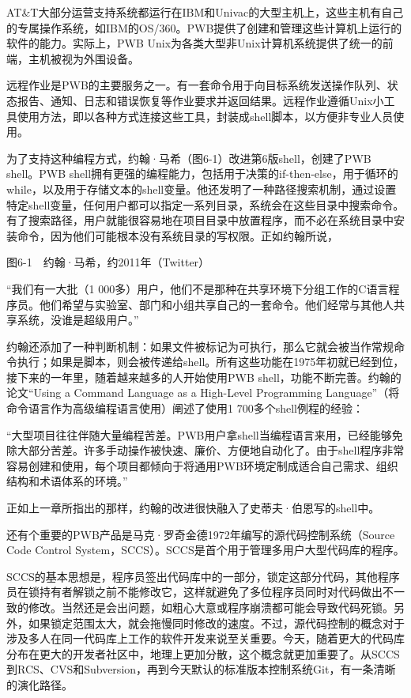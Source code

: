 \documentclass[a4paper,12pt,UTF8,twoside]{ctexbook}
\begin{document}
{{AT\&T大部分运营支持系统都运行在IBM和Univac的大型主机上，这些主机有自己的专属操作系统，如IBM的OS/360。PWB提供了创建和管理这些计算机上运行的软件的能力。实际上，PWB Unix为各类大型非Unix计算机系统提供了统一的前端，主机被视为外围设备。

远程作业是PWB的主要服务之一。有一套命令用于向目标系统发送操作队列、状态报告、通知、日志和错误恢复等作业要求并返回结果。远程作业遵循Unix小工具使用方法，即以各种方式连接这些工具，封装成shell脚本，以方便非专业人员使用。

为了支持这种编程方式，约翰·马希（图6-1）改进第6版shell，创建了PWB shell。PWB shell拥有更强的编程能力，包括用于决策的if-then-else，用于循环的while，以及用于存储文本的shell变量。他还发明了一种路径搜索机制，通过设置特定shell变量，任何用户都可以指定一系列目录，系统会在这些目录中搜索命令。有了搜索路径，用户就能很容易地在项目目录中放置程序，而不必在系统目录中安装命令，因为他们可能根本没有系统目录的写权限。正如约翰所说，



图6-1　约翰·马希，约2011年（Twitter）

“我们有一大批（1 000多）用户，他们不是那种在共享环境下分组工作的C语言程序员。他们希望与实验室、部门和小组共享自己的一套命令。他们经常与其他人共享系统，没谁是超级用户。”



约翰还添加了一种判断机制：如果文件被标记为可执行，那么它就会被当作常规命令执行；如果是脚本，则会被传递给shell。所有这些功能在1975年初就已经到位，接下来的一年里，随着越来越多的人开始使用PWB shell，功能不断完善。约翰的论文“Using a Command Language as a High-Level Programming Language”（将命令语言作为高级编程语言使用）阐述了使用1 700多个shell例程的经验：

“大型项目往往伴随大量编程苦差。PWB用户拿shell当编程语言来用，已经能够免除大部分苦差。许多手动操作被快速、廉价、方便地自动化了。由于shell程序非常容易创建和使用，每个项目都倾向于将通用PWB环境定制成适合自己需求、组织结构和术语体系的环境。”



正如上一章所指出的那样，约翰的改进很快融入了史蒂夫·伯恩写的shell中。

还有个重要的PWB产品是马克·罗奇金德1972年编写的源代码控制系统（Source Code Control System，SCCS）。SCCS是首个用于管理多用户大型代码库的程序。

SCCS的基本思想是，程序员签出代码库中的一部分，锁定这部分代码，其他程序员在锁持有者解锁之前不能修改它，这样就避免了多位程序员同时对代码做出不一致的修改。当然还是会出问题，如粗心大意或程序崩溃都可能会导致代码死锁。另外，如果锁定范围太大，就会拖慢同时修改的速度。不过，源代码控制的概念对于涉及多人在同一代码库上工作的软件开发来说至关重要。今天，随着更大的代码库分布在更大的开发者社区中，地理上更加分散，这个概念就更加重要了。从SCCS到RCS、CVS和Subversion，再到今天默认的标准版本控制系统Git，有一条清晰的演化路径。

}}
\end{document}
